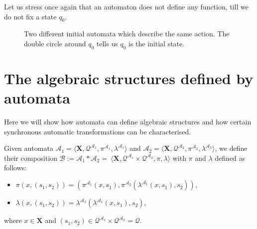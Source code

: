 \documentclass[mat1]{fmfdeloTS2.0}
\newcommand{\obs}{}				%
\newcommand{\abece}{\mathbf{X}}			%
\newcommand{\auto}{\mathcal}			%
\newcommand{\QQ}{\mathcal{Q}}			%
\begin{document}
Let us stress once again that an automaton does not define any function, till we do not fix a state $q_0$.
\begin{figure}[h]
\caption{Two different initial automata which describe the same action. The double circle around $q_0$ tells us $q_0$ is the initial state.}
\label{fig:equivalent initial automata}
\end{figure}

\smallskip
\section{The algebraic structures defined by automata}
Here we will show how automata can define algebraic structures and how certain synchronous automatic transformations can be characterised.

\begin{definition}\label{def:aut composition}
Given automata $\auto{A}_1=\langle \abece,\QQ^{\auto{A}_1},\pi^{\auto{A}_1},\lambda^{\auto{A}_1}\rangle$ and $\auto{A}_2=\langle  \abece,\QQ^{\auto{A}_2},\pi^{\auto{A}_2},\lambda^{\auto{A}_2}\rangle$, we define their \obs{composition} $\auto{B}:=\auto{A}_1*\auto{A}_2=\:\langle \abece,\QQ^{\auto{A}_1}\times\QQ^{\auto{A}_2},\pi,\lambda\rangle$ with $\pi$ and $\lambda$ defined as follows:
\begin{itemize}
\item $\pi(x,(s_1,s_2))=(\pi^{\auto{A}_1}(x,s_1),\pi^{\auto{A}_2}(\lambda^{\auto{A}_1}(x,s_1),s_2))$,
\item $\lambda(x,(s_1,s_2))=\lambda^{\auto{A}_2}(\lambda^{\auto{A}_1}(x,s_1),s_2)$,
\end{itemize}
where $x\in \abece$ and $(s_1,s_2)\in\QQ^{\auto{A}_1}\times\QQ^{\auto{A}_2}=\QQ$.
\end{definition}
\end{document}
